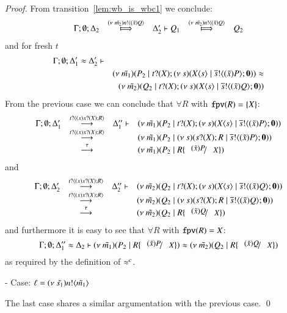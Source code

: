 \begin{proof}
	\noi From transition~\ref{lem:wb_is_wbc1} we conclude:
\[
	\begin{array}{rclcl}
		\Gamma; \es; \Delta_2 &\Hby{\news{\tilde{m_2}} \bactout{n}{(\tilde{x}) Q}}& \Delta_2' \proves Q_1 &\Hby{\news{\tilde{m_2}} \bactout{n}{(\tilde{x}) Q}}& Q_2\\
	\end{array}
\]
	\noi and for fresh $t$
%
	\begin{eqnarray*}
		\Gamma; \emptyset; \Delta_1' \approx \Delta_2' \vdash && \\
		&& (\nu\ \tilde{m_1})(P_2 \;|\; t ? (X) ; (\nu\ s)(X\langle s \rangle \;|\; \overline{s} ! \langle (\tilde{x}) P \rangle ; \mathbf{0})) \approx\\
		&& (\nu\ \tilde{m_2})(Q_2 \;|\; t ? (X) ; (\nu\ s)(X\langle s \rangle \;|\; \overline{s} ! \langle (\tilde{x}) Q \rangle ; \mathbf{0})) 
	\end{eqnarray*}
%
	\noi From the  previous case we can conclude that $\forall R$ with $\mathtt{fpv}(R) = \{X\}$:
\[
	\begin{array}{rcll}
		\Gamma; \es; \Delta_1' &\by{\bactinp{t}{(x) \binp{x}{X} R}}& \Delta_1'' \proves& \newsp{\tilde{m_1}}{P_2 \Par \binp{t}{X} \newsp{s}{\appl{X}{s} \Par \bout{\dual{s}}{(\tilde{x}) P} \inact}} \\
		&\by{\bactinp{t}{(x) \binp{x}{X} R}}& &\newsp{\tilde{m_1}}{P_2 \Par \newsp{s}{\binp{s}{X} R \Par \bout{\dual{s}}{(\tilde{x}) P} \inact}}\\
		&\by{\tau}&& \newsp{\tilde{m_1}}{P_2 \Par  R \subst{(\tilde{x}) P}{X}}
	\end{array}
\]
	\noi and
\[
	\begin{array}{rcll}
		\Gamma; \es; \Delta_2' &\by{\bactinp{t}{(x) \binp{x}{X} R}}& \Delta_2'' \proves& \newsp{\tilde{m_2}}{Q_2 \Par \binp{t}{X} \newsp{s}{\appl{X}{s} \Par \bout{\dual{s}}{(\tilde{x}) Q} \inact}} \\
		 &\by{\bactinp{t}{(x) \binp{x}{X} R}}& &\newsp{\tilde{m_2}}{Q_2 \Par \newsp{s}{\binp{s}{X} R \Par \bout{\dual{s}}{(\tilde{x}) Q} \inact}}\\
		&\by{\tau}&& \newsp{\tilde{m_2}}{Q_2 \Par  R \subst{(\tilde{x}) Q}{X}}
	\end{array}
\]
	\noi and furthermore it is easy to see that $\forall R$ with $\mathtt{fpv}(R) = X$:
\[
	\Gamma; \es; \Delta_1'' \wb \Delta_2 \proves \newsp{\tilde{m_1}}{P_2 \Par  R \subst{(\tilde{x}) P}{X}} \wb \newsp{\tilde{m_2}}{Q_2 \Par R \subst{(\tilde{x}) Q}{X}}
\]
	\noi as required by the definition of $\approx^{c}$.


	\noi - Case: $\ell = (\nu\ \tilde{s_1}) n ! \langle \tilde{m_1} \rangle$

	The last case shares a similar argumentation with the previous case.
	\qed
\end{proof}


